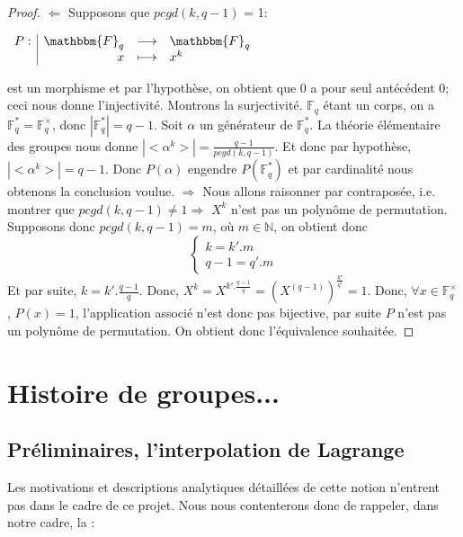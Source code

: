 \documentclass[12pt]{article}
\newcommand{\F}{\mathbbm{F}}
\newcommand{\Fq}{\mathds{F}_q}
\theoremstyle{definition}
\begin{document}
\begin{proof}

$\Leftarrow$ Supposons que $pcgd(k,q-1)$ = 1:
\begin{center}
$
\begin{array}{l|rcl}
\displaystyle
P : & \F _q & \longrightarrow & \F _q \\
    & x & \longmapsto & x^k
\end{array}
$
\end{center}
est un morphisme et par l'hypothèse, on obtient que $0$ a pour seul antécédent 0; ceci nous donne l'injectivité. Montrons la surjectivité.\newline
$\Fq$ étant un corps, on a $\Fq^* = \Fq^{\times}$, donc $|\Fq^*| = q-1$. Soit $\alpha$ un générateur de $\Fq^*$. La théorie élémentaire des groupes nous donne $|<\alpha^k>| = \frac{q-1}{pcgd(k,q-1)}$. Et donc par hypothèse, $|<\alpha^k>| =  q-1$.  Donc $P(\alpha)$ engendre $P(\Fq^*)$ et par cardinalité nous obtenons la conclusion voulue.\newline
$\Rightarrow$ Nous allons raisonner par contraposée, i.e. montrer que $pcgd(k,q-1) \ne 1 \Rightarrow$ $X^k$ n'est pas un polynôme de permutation.\newline
Supposons donc $pcgd(k,q-1) = m$, où $m \in \mathds{N}$, on obtient donc 
$$
\left\{
    \begin{array}{ll}
        k = k'.m \\
        q-1 = q'.m
    \end{array}
\right.
$$
Et par suite, $k  =k'.\frac{q-1}{q}$.\newline
Donc, $X^k = X^{k'.\frac{q-1}{q}} = (X^{(q-1)})^{\frac{k'}{q'}} = 1$. Donc, $\forall x \in \Fq^{\times}$, $P(x) = 1$, l'application associé n'est donc pas bijective, par suite $P$ n'est pas un polynôme de permutation. \newline
On obtient donc l'équivalence souhaitée.
\end{proof}

\pagebreak
\section{Histoire de groupes...}
\subsection{Préliminaires, l'interpolation de Lagrange}

Les motivations et descriptions analytiques détaillées de cette notion n'entrent pas dans le cadre de ce projet. Nous nous contenterons donc de rappeler, dans notre cadre, la :
\end{document}
